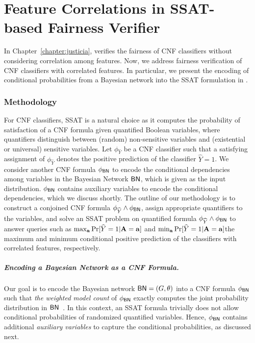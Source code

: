 \chapter{Feature Correlations in SSAT-based Fairness Verifier}
In Chapter~\ref{chapter:justicia}, {\justicia} verifies the fairness of CNF classifiers without considering correlation among features. Now, we address fairness verification of CNF classifiers with correlated features. In particular, we present the encoding of conditional probabilities from a Bayesian network into the SSAT formulation in {\justicia}. 







\subsection*{Methodology}
For CNF classifiers, SSAT is a natural choice as it computes the probability of satisfaction of a CNF formula  given quantified Boolean variables, where quantifiers distinguish between (random) non-sensitive variables and (existential or universal) sensitive variables. Let $ \phi_{\widehat{Y}} $ be a CNF classifier such that a satisfying assignment of $ \phi_{\widehat{Y}} $ denotes the positive prediction of the classifier $ \widehat{Y} = 1 $. We consider another CNF formula $ \phi_{\mathsf{BN}} $ to encode the conditional dependencies among variables in the Bayesian Network $ \mathsf{BN} $, which is given as the input distribution. $ \phi_{\mathsf{BN}} $ contains auxiliary variables to encode the conditional dependencies, which we discuss shortly. The outline of our methodology is to construct a conjoined CNF formula $ \phi_{\widehat{Y}} \wedge \phi_{\mathsf{BN}} $, assign appropriate quantifiers to the variables, and solve an SSAT problem on quantified formula $ \phi_{\widehat{Y}} \wedge \phi_{\mathsf{BN}} $ to answer queries such as $ \max_{\mathbf{a}} \Pr[\widehat{Y} = 1 | \mathbf{A} = \mathbf{a}] $ and $ \min_{\mathbf{a}} \Pr[\widehat{Y} = 1 | \mathbf{A} = \mathbf{a}] $\textemdash the maximum and minimum conditional positive prediction of the classifiers with correlated features, respectively.




\paragraph{Encoding a Bayesian Network as a CNF Formula.}\label{sec:BN_to_CNF}
Our goal is to encode the Bayesian network $ \mathsf{BN} = (G, \theta) $ into a CNF formula $ \phi_{\mathsf{BN}} $ such that \textit{the weighted model count} of $ \phi_{\mathsf{BN}} $ exactly computes the joint probability distribution in $ \mathsf{BN} $~\cite{chavira2008probabilistic}.  In this context, an SSAT formula trivially does not allow conditional probabilities of randomized quantified variables. Hence, $ \phi_{\mathsf{BN}} $ contains additional \textit{auxiliary variables} to capture the conditional probabilities, as discussed next.


